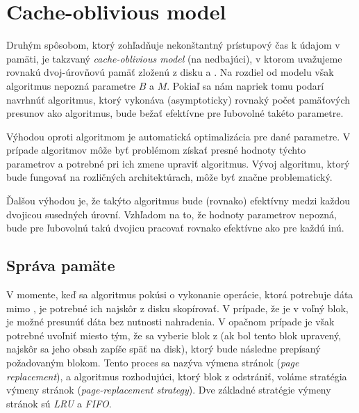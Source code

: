 \section{Cache-oblivious model}
Druhým spôsobom, ktorý zohľadňuje nekonštantný prístupový čas k údajom v pamäti, je takzvaný \emph{cache-oblivious model} (na \cache nedbajúci), v ktorom uvažujeme rovnakú dvoj-úrovňovú pamäť zloženú z disku a \cache \citep{frigo1999cache,prokop1999cache}. Na rozdiel od \aware modelu však algoritmus nepozná parametre $B$ a $M$. Pokiaľ sa nám napriek tomu podarí navrhnúť algoritmus, ktorý vykonáva (asymptoticky) rovnaký počet pamäťových presunov ako \aware algoritmus, bude bežať efektívne pre ľubovolné takéto parametre.


Výhodou oproti \aware algoritmom je automatická optimalizácia pre dané parametre. V prípade \aware algoritmov môže byť problémom získať presné hodnoty týchto parametrov a potrebné pri ich zmene upraviť algoritmus. Vývoj algoritmu, ktorý bude fungovať na rozličných architektúrach, môže byť značne problematický.

Ďalšou výhodou je, že takýto \obliv algoritmus bude (rovnako) efektívny medzi každou dvojicou susedných úrovní. Vzhľadom na to, že hodnoty parametrov nepozná, bude pre ľubovolnú takú dvojicu pracovať rovnako efektívne ako pre každú inú.


\subsection{Správa pamäte} \label{sec:memmng}
V momente, keď sa \obliv algoritmus pokúsi o vykonanie operácie, ktorá potrebuje dáta mimo \cache, je potrebné ich najskôr z disku skopírovať. V prípade, že je v \cache voľný blok, je možné presunúť dáta bez nutnosti nahradenia. V opačnom prípade je však potrebné uvoľniť miesto tým, že sa vyberie blok z \cache (ak bol tento blok upravený, najskôr sa jeho obsah zapíše späť na disk), ktorý bude následne prepísaný požadovaným blokom. Tento proces sa nazýva výmena stránok ({\em page replacement}), a algoritmus rozhodujúci, ktorý blok z \cache odstrániť, voláme stratégia výmeny stránok ({\em page-replacement strategy}). Dve základné stratégie výmeny stránok sú \emph{LRU} a \emph{FIFO}.

